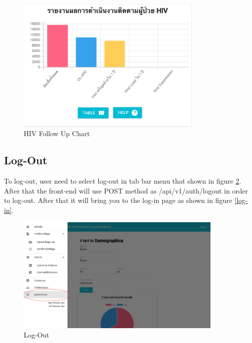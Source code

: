 	
    	\FloatBarrier
        	\begin{figure}[h!]
                \centering
            		\includegraphics[width=9cm]{images/chapter-05/pie-graph-follow-hiv.png}
            		\caption{HIV Follow Up Chart}
            		\label{pie-graph-follow-hiv}
            \end{figure}
    	\FloatBarrier
	
	
	\subsection{Log-Out}
	
	
	To log-out, user need to select log-out in tab bar menu that shown in figure \ref{log-out}.  After that the front-end will use POST method as /api/v1/auth/logout in order to log-out. After that it will bring you to the log-in page as shown in figure \ref{log-in}.
	
	\vspace{10mm}
    \FloatBarrier
    	\begin{figure}[h!]
            \centering
        		\includegraphics[width=10cm]{images/chapter-05/log-out.png}
        		\caption{Log-Out}
        		\label{log-out}
        \end{figure}
	\FloatBarrier